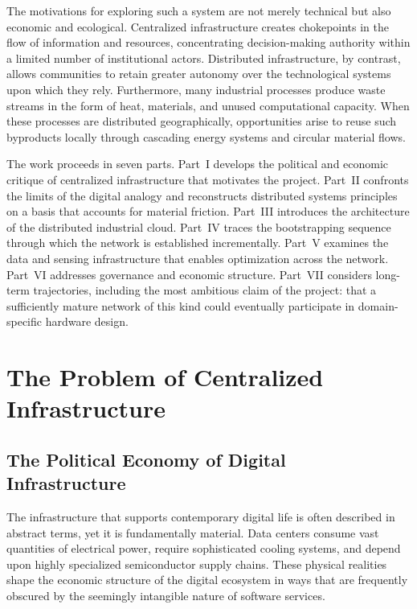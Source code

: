 \documentclass[12pt]{book}
\theoremstyle{definition}
\theoremstyle{remark}
\begin{document}
The motivations for exploring such a system are not merely technical
but also economic and ecological. Centralized infrastructure creates
chokepoints in the flow of information and resources, concentrating
decision-making authority within a limited number of institutional
actors. Distributed infrastructure, by contrast, allows communities
to retain greater autonomy over the technological systems upon which
they rely. Furthermore, many industrial processes produce waste
streams in the form of heat, materials, and unused computational
capacity. When these processes are distributed geographically,
opportunities arise to reuse such byproducts locally through
cascading energy systems and circular material flows.

The work proceeds in seven parts. Part~I develops the political and
economic critique of centralized infrastructure that motivates the
project. Part~II confronts the limits of the digital analogy and
reconstructs distributed systems principles on a basis that accounts
for material friction. Part~III introduces the architecture of the
distributed industrial cloud. Part~IV traces the bootstrapping
sequence through which the network is established incrementally.
Part~V examines the data and sensing infrastructure that enables
optimization across the network. Part~VI addresses governance and
economic structure. Part~VII considers long-term trajectories,
including the most ambitious claim of the project: that a sufficiently
mature network of this kind could eventually participate in
domain-specific hardware design.

\mainmatter

\part{The Problem of Centralized Infrastructure}

\chapter{The Political Economy of Digital Infrastructure}

The infrastructure that supports contemporary digital life is often
described in abstract terms, yet it is fundamentally material. Data
centers consume vast quantities of electrical power, require
sophisticated cooling systems, and depend upon highly specialized
semiconductor supply chains. These physical realities shape the
economic structure of the digital ecosystem in ways that are
frequently obscured by the seemingly intangible nature of software
services.
\end{document}
